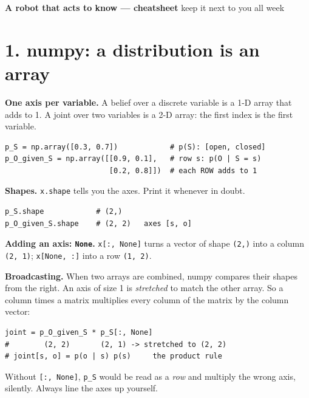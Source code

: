 \documentclass[10pt]{article}
\begin{document}
{\Large\bfseries A robot that acts to know \;---\; cheatsheet}\hfill{\small\color{muted} keep it next to you all week}

\vspace{0.3em}
\section*{1. numpy: a distribution is an array}

\textbf{One axis per variable.} A belief over a discrete variable is a 1-D array that adds to 1.
A joint over two variables is a 2-D array: the first index is the first variable.
\begin{lstlisting}
p_S = np.array([0.3, 0.7])            # p(S): [open, closed]
p_O_given_S = np.array([[0.9, 0.1],   # row s: p(O | S = s)
                        [0.2, 0.8]])  # each ROW adds to 1
\end{lstlisting}

\textbf{Shapes.} \texttt{x.shape} tells you the axes. Print it whenever in doubt.
\begin{lstlisting}
p_S.shape            # (2,)
p_O_given_S.shape    # (2, 2)   axes [s, o]
\end{lstlisting}

\textbf{Adding an axis: \texttt{None}.} \texttt{x[:, None]} turns a vector of shape \texttt{(2,)}
into a column \texttt{(2, 1)}; \texttt{x[None, :]} into a row \texttt{(1, 2)}.

\textbf{Broadcasting.} When two arrays are combined, numpy compares their shapes from the
right. An axis of size 1 is \emph{stretched} to match the other array. So a column times a
matrix multiplies every column of the matrix by the column vector:
\begin{lstlisting}
joint = p_O_given_S * p_S[:, None]
#        (2, 2)       (2, 1) -> stretched to (2, 2)
# joint[s, o] = p(o | s) p(s)     the product rule
\end{lstlisting}
Without \texttt{[:, None]}, \texttt{p\_S} would be read as a \emph{row} and multiply the
wrong axis, silently. Always line the axes up yourself.

\begin{center}
\end{center}
\end{document}

